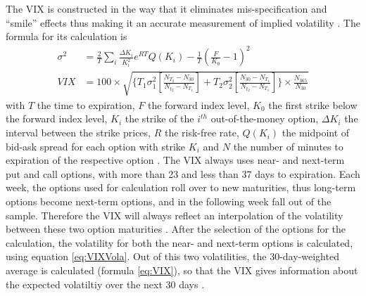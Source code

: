 The \ac{VIX} is constructed in the way that it eliminates mis-specification and ``smile'' effects thus making it an accurate measurement of implied volatility \parencite{blair2001}. The formula for its calculation is
\begin{align}
\sigma^{2} &= \frac{2}{T} \sum_{i} \frac{\Delta K_{i}}{K_{i}^{2}} e^{RT} Q(K_{i}) - \frac{1}{T} (\frac{F}{K_{0}} - 1)^{2} \label{eq:VIXVola}\\
VIX &= 100 \times \sqrt{ \lbrace T_{1}\sigma^{2}_{1}[\frac{N_{T_{2}} - N_{30}}{N_{t_{2}}-N_{T_{1}}}] + T_{2}\sigma^{2}_{2}[\frac{N_{30} - N_{T_{1}}}{N_{t_{2}}-N_{T_{1}}}] \rbrace \times \frac{N_{365}}{N_{30}}} \label{eq:VIX}
\end{align}
with $T$ the time to expiration, $F$ the forward index level, $K_{0}$ the first strike below the forward index level, $K_{i}$ the strike of the $i^{th}$ out-of-the-money option, $\Delta K_{i}$ the interval between the strike prices, $R$ the risk-free rate, $Q(K_{i})$ the midpoint of bid-ask spread for each option with strike $K_{i}$ and $N$ the number of minutes to expiration of the respective option \parencite{exchange2009}. The \ac{VIX} always uses near- and next-term put and call options, with more than 23 and less than 37 days to expiration. Each week, the options used for calculation roll over to new maturities, thus long-term options become next-term options, and in the following week fall out of the sample. Therefore the \ac{VIX} will always reflect an interpolation of the volatility between these two option maturities \parencite{poon2003}. After the selection of the options for the calculation, the volatility for both the near- and next-term options is calculated, using equation \ref{eq:VIXVola}. Out of this two volatilities, the 30-day-weighted average is calculated (formula \ref{eq:VIX}), so that the \ac{VIX} gives information about the expected volatiltiy over the next 30 days \parencite{exchange2009}. 






